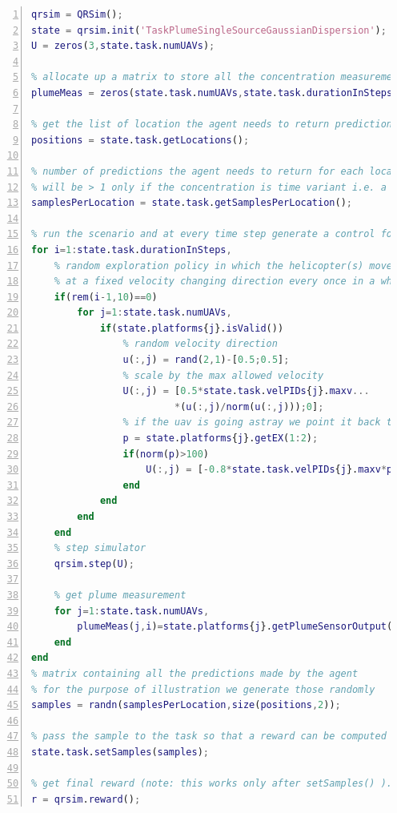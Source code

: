 \documentclass[a4paper,11pt]{report}
\begin{document}
\begin{lstlisting}[float=ht!bp,caption=main\_plume.m,language=Matlab,frame=lines,label=lst:mpl,numbers=left,basicstyle=\small]
% create simulator object and load task parameters
qrsim = QRSim();
state = qrsim.init('TaskPlumeSingleSourceGaussianDispersion');
U = zeros(3,state.task.numUAVs);

% allocate up a matrix to store all the concentration measurements
plumeMeas = zeros(state.task.numUAVs,state.task.durationInSteps);

% get the list of location the agent needs to return predictions at.
positions = state.task.getLocations();

% number of predictions the agent needs to return for each location,
% will be > 1 only if the concentration is time variant i.e. a puff model
samplesPerLocation = state.task.getSamplesPerLocation();

% run the scenario and at every time step generate a control for each uav
for i=1:state.task.durationInSteps,    
    % random exploration policy in which the helicopter(s) moves around
    % at a fixed velocity changing direction every once in a while 
    if(rem(i-1,10)==0)
        for j=1:state.task.numUAVs,
            if(state.platforms{j}.isValid())                
                % random velocity direction
                u(:,j) = rand(2,1)-[0.5;0.5];            
                % scale by the max allowed velocity
                U(:,j) = [0.5*state.task.velPIDs{j}.maxv...
                         *(u(:,j)/norm(u(:,j)));0];                                
                % if the uav is going astray we point it back to the center
                p = state.platforms{j}.getEX(1:2);
                if(norm(p)>100)
                    U(:,j) = [-0.8*state.task.velPIDs{j}.maxv*p/norm(p);0];
                end    
            end
        end
    end    
    % step simulator
    qrsim.step(U);

    % get plume measurement
    for j=1:state.task.numUAVs,
        plumeMeas(j,i)=state.platforms{j}.getPlumeSensorOutput();
    end
end
% matrix containing all the predictions made by the agent
% for the purpose of illustration we generate those randomly 
samples = randn(samplesPerLocation,size(positions,2));

% pass the sample to the task so that a reward can be computed
state.task.setSamples(samples);

% get final reward (note: this works only after setSamples() ).
r = qrsim.reward();
\end{lstlisting}
\end{document}

